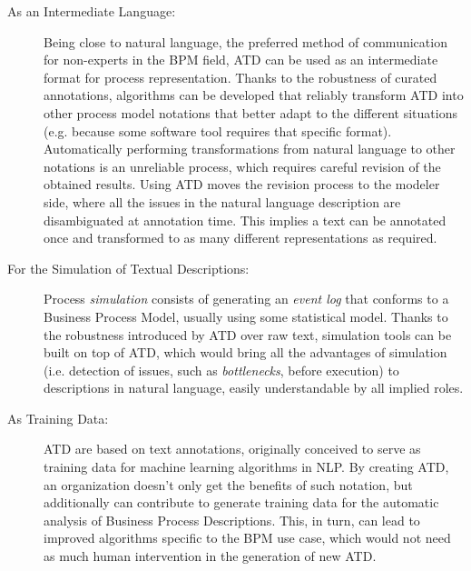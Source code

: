 \begin{description}
  \item[As an Intermediate Language:]{Being close to natural language, the
      preferred method of communication for non-experts in the BPM field, ATD
      can be used as an intermediate format for process representation. Thanks
      to the robustness of curated annotations, algorithms can be developed that
      reliably transform ATD into other process model notations that better
      adapt to the different situations (e.g. because some software tool
      requires that specific format). Automatically performing transformations
      from natural language to other notations is an unreliable process, which
      requires careful revision of the obtained results. Using ATD moves the
      revision process to the modeler side, where all the issues in the natural
      language description are disambiguated at annotation time. This implies a
      text can be annotated once and transformed to as many different
      representations as required.}
  \item[For the Simulation of Textual Descriptions:]{Process \emph{simulation} consists
      of generating an \emph{event log} that conforms to a Business Process
      Model, usually using some statistical model. Thanks to the robustness
      introduced by ATD over raw text, simulation tools can be built on top of
      ATD, which would bring all the advantages of simulation (i.e. detection of
      issues, such as \emph{bottlenecks}, before execution) to descriptions in
      natural language, easily understandable by all implied roles.}
  \item[As Training Data:]{ATD are based on text annotations, originally
      conceived to serve as training data for machine learning algorithms in
      NLP. By creating ATD, an organization doesn't only get the benefits of
      such notation, but additionally can contribute to generate training data
      for the automatic analysis of Business Process Descriptions. This, in
      turn, can lead to improved algorithms specific to the BPM use case, which
      would not need as much human intervention in the generation of new ATD.}
\end{description}



